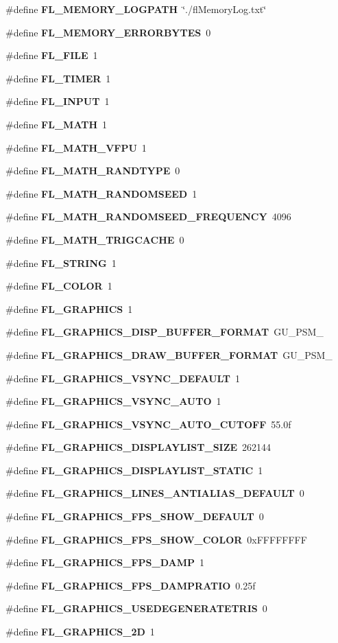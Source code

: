 \begin{CompactItemize}
\#define {\bf FL\_\-MEMORY\_\-LOGPATH}~\char`\"{}./fl\-Memory\-Log.txt\char`\"{}
\item 
\#define {\bf FL\_\-MEMORY\_\-ERRORBYTES}~0
\item 
\#define {\bf FL\_\-FILE}~1
\item 
\#define {\bf FL\_\-TIMER}~1
\item 
\#define {\bf FL\_\-INPUT}~1
\item 
\#define {\bf FL\_\-MATH}~1
\item 
\#define {\bf FL\_\-MATH\_\-VFPU}~1
\item 
\#define {\bf FL\_\-MATH\_\-RANDTYPE}~0
\item 
\#define {\bf FL\_\-MATH\_\-RANDOMSEED}~1
\item 
\#define {\bf FL\_\-MATH\_\-RANDOMSEED\_\-FREQUENCY}~4096
\item 
\#define {\bf FL\_\-MATH\_\-TRIGCACHE}~0
\item 
\#define {\bf FL\_\-STRING}~1
\item 
\#define {\bf FL\_\-COLOR}~1
\item 
\#define {\bf FL\_\-GRAPHICS}~1
\item 
\#define {\bf FL\_\-GRAPHICS\_\-DISP\_\-BUFFER\_\-FORMAT}~GU\_\-PSM\_
\item 
\#define {\bf FL\_\-GRAPHICS\_\-DRAW\_\-BUFFER\_\-FORMAT}~GU\_\-PSM\_
\item 
\#define {\bf FL\_\-GRAPHICS\_\-VSYNC\_\-DEFAULT}~1
\item 
\#define {\bf FL\_\-GRAPHICS\_\-VSYNC\_\-AUTO}~1
\item 
\#define {\bf FL\_\-GRAPHICS\_\-VSYNC\_\-AUTO\_\-CUTOFF}~55.0f
\item 
\#define {\bf FL\_\-GRAPHICS\_\-DISPLAYLIST\_\-SIZE}~262144
\item 
\#define {\bf FL\_\-GRAPHICS\_\-DISPLAYLIST\_\-STATIC}~1
\item 
\#define {\bf FL\_\-GRAPHICS\_\-LINES\_\-ANTIALIAS\_\-DEFAULT}~0
\item 
\#define {\bf FL\_\-GRAPHICS\_\-FPS\_\-SHOW\_\-DEFAULT}~0
\item 
\#define {\bf FL\_\-GRAPHICS\_\-FPS\_\-SHOW\_\-COLOR}~0x\-FFFFFFFF
\item 
\#define {\bf FL\_\-GRAPHICS\_\-FPS\_\-DAMP}~1
\item 
\#define {\bf FL\_\-GRAPHICS\_\-FPS\_\-DAMPRATIO}~0.25f
\item 
\#define {\bf FL\_\-GRAPHICS\_\-USEDEGENERATETRIS}~0
\item 
\#define {\bf FL\_\-GRAPHICS\_\-2D}~1

\end{CompactItemize}
